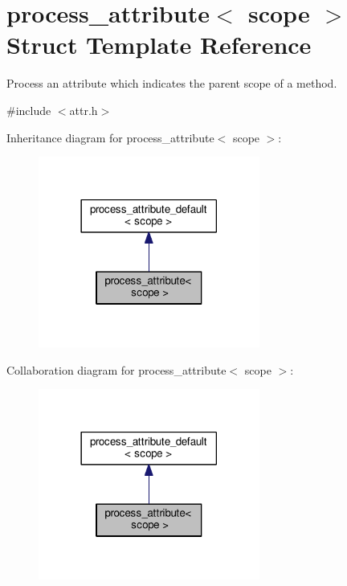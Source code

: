 \hypertarget{structprocess__attribute_3_01scope_01_4}{}\section{process\+\_\+attribute$<$ scope $>$ Struct Template Reference}
\label{structprocess__attribute_3_01scope_01_4}


Process an attribute which indicates the parent scope of a method.  




{\ttfamily \#include $<$attr.\+h$>$}



Inheritance diagram for process\+\_\+attribute$<$ scope $>$\+:
\nopagebreak
\begin{figure}[H]
\begin{center}
\leavevmode
\includegraphics[width=206pt]{structprocess__attribute_3_01scope_01_4__inherit__graph}
\end{center}
\end{figure}


Collaboration diagram for process\+\_\+attribute$<$ scope $>$\+:
\nopagebreak
\begin{figure}[H]
\begin{center}
\leavevmode
\includegraphics[width=206pt]{structprocess__attribute_3_01scope_01_4__coll__graph}
\end{center}
\end{figure}
